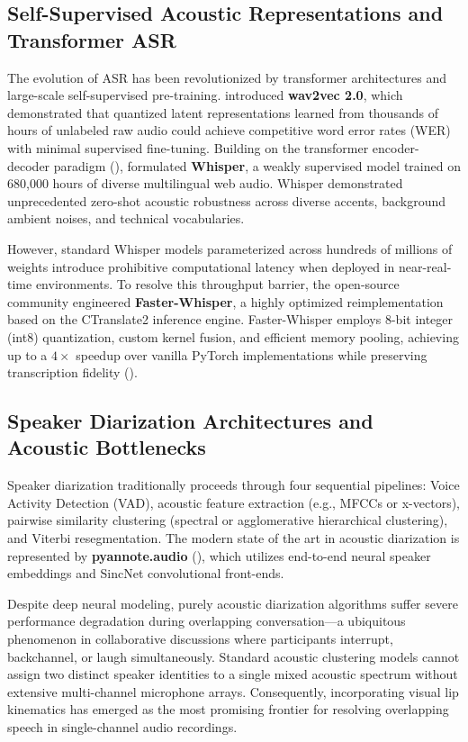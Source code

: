 \documentclass[12pt,a4paper,oneside]{report}
\providecommand{\parencite}[1]{(\cite{#1})}
\providecommand{\textcite}[1]{\cite{#1}}
\begin{document}
\subsection{Self-Supervised Acoustic Representations and Transformer ASR}
The evolution of ASR has been revolutionized by transformer architectures and large-scale self-supervised pre-training. \textcite{baevski2020wav2vec} introduced \textbf{wav2vec 2.0}, which demonstrated that quantized latent representations learned from thousands of hours of unlabeled raw audio could achieve competitive word error rates (WER) with minimal supervised fine-tuning. Building on the transformer encoder-decoder paradigm \parencite{vaswani2017attention}, \textcite{radford2023robust} formulated \textbf{Whisper}, a weakly supervised model trained on 680,000 hours of diverse multilingual web audio. Whisper demonstrated unprecedented zero-shot acoustic robustness across diverse accents, background ambient noises, and technical vocabularies. 

However, standard Whisper models parameterized across hundreds of millions of weights introduce prohibitive computational latency when deployed in near-real-time environments. To resolve this throughput barrier, the open-source community engineered \textbf{Faster-Whisper}, a highly optimized reimplementation based on the CTranslate2 inference engine. Faster-Whisper employs 8-bit integer (int8) quantization, custom kernel fusion, and efficient memory pooling, achieving up to a $4\times$ speedup over vanilla PyTorch implementations while preserving transcription fidelity \parencite{radford2023robust}.

\subsection{Speaker Diarization Architectures and Acoustic Bottlenecks}
Speaker diarization traditionally proceeds through four sequential pipelines: Voice Activity Detection (VAD), acoustic feature extraction (e.g., MFCCs or x-vectors), pairwise similarity clustering (spectral or agglomerative hierarchical clustering), and Viterbi resegmentation. The modern state of the art in acoustic diarization is represented by \textbf{pyannote.audio} \parencite{bredin2020pyannote}, which utilizes end-to-end neural speaker embeddings and SincNet convolutional front-ends. 

Despite deep neural modeling, purely acoustic diarization algorithms suffer severe performance degradation during overlapping conversation—a ubiquitous phenomenon in collaborative discussions where participants interrupt, backchannel, or laugh simultaneously. Standard acoustic clustering models cannot assign two distinct speaker identities to a single mixed acoustic spectrum without extensive multi-channel microphone arrays. Consequently, incorporating visual lip kinematics has emerged as the most promising frontier for resolving overlapping speech in single-channel audio recordings.
\end{document}
